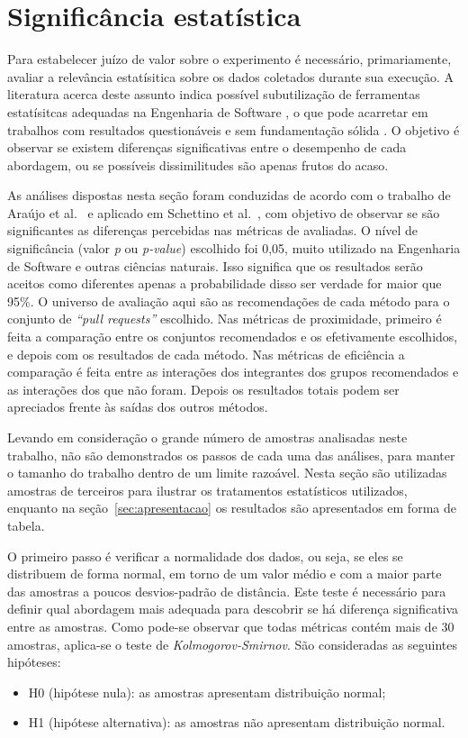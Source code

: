 \documentclass[12pt,openany,oneside,a4paper,english,brazil]{abntbibufjf}
\begin{document}
    \section{Significância estatística}

    Para estabelecer juízo de valor sobre o experimento é necessário, primariamente, avaliar a relevância estatísitica sobre os dados coletados durante sua execução. A literatura acerca deste assunto indica possível subutilização de ferramentas estatísitcas adequadas na Engenharia de Software \cite{miller1997}, o que pode acarretar em trabalhos com resultados questionáveis e sem fundamentação sólida \cite{dybaa2006}. O objetivo é observar se existem diferenças significativas entre o desempenho de cada abordagem, ou se possíveis dissimilitudes são apenas frutos do acaso.

    As análises dispostas nesta seção foram conduzidas de acordo com o trabalho de Araújo et al.~\cite{araujo2006} e aplicado em Schettino et al.~\cite{schettino2014}, com objetivo de observar se são significantes as diferenças percebidas nas métricas de avaliadas. O nível de significância (valor \textit{p} ou \textit{p-value}) escolhido foi 0,05, muito utilizado na Engenharia de Software e outras ciências naturais. Isso significa que os resultados serão aceitos como diferentes apenas a probabilidade disso ser verdade for maior que 95\%. O universo de avaliação aqui são as recomendações de cada método para o conjunto de  \textit{``pull requests''} escolhido. Nas métricas de proximidade, primeiro é feita a comparação entre os conjuntos recomendados e os efetivamente escolhidos, e depois com os resultados de cada método. Nas métricas de eficiência a comparação é feita entre as interações dos integrantes dos grupos recomendados e as interações dos que não foram. Depois os resultados totais podem ser apreciados frente às saídas dos outros métodos.

    Levando em consideração o grande número de amostras analisadas neste trabalho, não são demonstrados os passos de cada uma das análises, para manter o tamanho do trabalho dentro de um limite razoável. Nesta seção são utilizadas amostras de terceiros para ilustrar os tratamentos estatísticos utilizados, enquanto na seção~\ref{sec:apresentacao} os resultados são apresentados em forma de tabela.

    O primeiro passo é verificar a normalidade dos dados, ou seja, se eles se distribuem de forma normal, em torno de um valor médio e com a maior parte das amostras a poucos desvios-padrão de distância. Este teste é necessário para definir qual abordagem mais adequada para descobrir se há diferença significativa entre as amostras. Como pode-se observar que todas métricas contém mais de 30 amostras, aplica-se o teste de \textit{Kolmogorov-Smirnov}. São consideradas as seguintes hipóteses:
    \begin{itemize}
      \item H0 (hipótese nula): as amostras apresentam distribuição normal;
      \item H1 (hipótese alternativa): as amostras não apresentam distribuição normal.
    \end{itemize}
\end{document}
